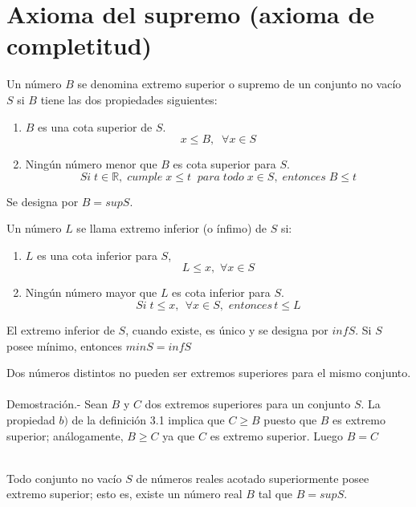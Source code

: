 \chapter{Axioma del supremo (axioma de completitud)}
\begin{tcolorbox}
\begin{def.}
Un número $B$ se denomina extremo superior o supremo de un conjunto no vacío $S$ si $B$ tiene las dos propiedades siguientes:
\begin{enumerate}[\bfseries a)]
\item $B$ es una cota superior de $S$.
$$ x\leq B,\;\; \forall x \in S $$
\item Ningún número menor que $B$ es cota superior para $S$.
$$Si \; t  \in \mathbb{R}, \; cumple \; x \leq t \; \; para \; todo \; x \in S, \; entonces \; B \leq t$$
\end{enumerate}
Se designa por $B = supS$.
\end{def.}
\begin{def.}
Un número $L$ se llama extremo inferior (o ínfimo) de $S$ si:
\begin{enumerate}[\bfseries a)]
\item $L$ es una cota inferior para $S$,
$$L\leq x, \, \, \forall x \in S$$
\item Ningún número mayor que $L$ es cota inferior para $S$.
$$Si \; t\leq x, \, \; \forall x \in S, \, \, entonces \, t\leq L $$
\end{enumerate}
El extremo inferior de $S$, cuando existe, es único y se designa por $infS$. Si $S$ posee mínimo, entonces $minS=infS$\\
\end{def.}
\end{tcolorbox}

\begin{teo}
Dos números distintos no pueden ser extremos superiores para el mismo conjunto.\\\\
Demostración.- \; Sean $B$ y $C$ dos extremos superiores para un conjunto $S$. La propiedad $b)$ de la definición 3.1 implica que $C\geq B$ puesto que $B$ es extremo superior; análogamente, $B \geq C$ ya que $C$ es extremo superior. Luego $B = C$ \\\\
\end{teo}

\begin{tcolorbox}
\begin{axioma}
Todo conjunto no vacío $S$ de números reales acotado superiormente posee extremo superior; esto es, existe un número real $B$ tal que $B=supS$.\\
\end{axioma}
\end{tcolorbox}

